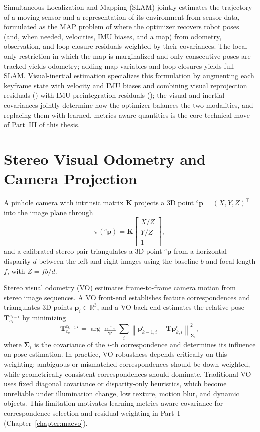 Simultaneous Localization and Mapping (SLAM) jointly estimates the trajectory of a moving sensor and a representation of its environment from sensor data, formulated as the MAP problem of  where the optimizer recovers robot poses (and, when needed, velocities, IMU biases, and a map) from odometry, observation, and loop-closure residuals weighted by their covariances.
The local-only restriction in which the map is marginalized and only consecutive poses are tracked yields odometry; adding map variables and loop closures yields full SLAM.
Visual-inertial estimation specializes this formulation by augmenting each keyframe state with velocity and IMU biases and combining visual reprojection residuals () with IMU preintegration residuals (); the visual and inertial covariances jointly determine how the optimizer balances the two modalities, and replacing them with learned, metrics-aware quantities is the core technical move of Part~III of this thesis.

\section{Stereo Visual Odometry and Camera Projection}
\label{sec:ch2_vo}

A pinhole camera with intrinsic matrix $\mathbf{K}$ projects a 3D point ${}^{c}\mathbf{p} = (X,Y,Z)^{\top}$ into the image plane through
\begin{equation}
\label{eq:ch2:projection}
\pi({}^{c}\mathbf{p}) = \mathbf{K} \begin{bmatrix} X/Z \\ Y/Z \\ 1 \end{bmatrix},
\end{equation}
and a calibrated stereo pair triangulates a 3D point ${}^{c}\mathbf{p}$ from a horizontal disparity $d$ between the left and right images using the baseline $b$ and focal length $f$, with $Z = fb/d$.

Stereo visual odometry (VO) estimates frame-to-frame camera motion from stereo image sequences.
A VO front-end establishes feature correspondences and triangulates 3D points $\mathbf{p}_i \in \mathbb{R}^3$, and a VO back-end estimates the relative pose $\mathbf{T}^{c_{k-1}}_{c_k}$ by minimizing
\begin{equation}
\label{eq:ch2:vo}
\mathbf{T}^{c_{k-1}}_{c_k}{}^{\star} = \arg\min_{\mathbf{T}} \sum_{i} \left\| \mathbf{p}^{c}_{k-1,i} - \mathbf{T} \mathbf{p}^{c}_{k,i} \right\|^2_{\bm{\Sigma}_i},
\end{equation}
where $\bm{\Sigma}_i$ is the covariance of the $i$-th correspondence and determines its influence on pose estimation.
In practice, VO robustness depends critically on this weighting: ambiguous or mismatched correspondences should be down-weighted, while geometrically consistent correspondences should dominate.
Traditional VO uses fixed diagonal covariance or disparity-only heuristics, which become unreliable under illumination change, low texture, motion blur, and dynamic objects.
This limitation motivates learning metrics-aware covariance for correspondence selection and residual weighting in Part~I (Chapter~\ref{chapter:macvo}).

